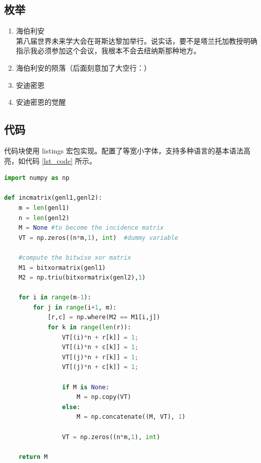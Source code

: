 \documentclass[12]{ctexart}
\begin{document}
\subsection{枚举}

\begin{enumerate}
    \item 海伯利安\\
    第八届世界未来学大会在哥斯达黎加举行。说实话，要不是塔兰托加教授明确指示我必须参加这个会议，我根本不会去纽纳斯那种地方。

    \item 海伯利安的陨落（后面刻意加了大空行：）\\

    \item 安迪密恩

    \item 安迪密恩的觉醒

\end{enumerate}

\subsection{代码}

代码块使用 listings 宏包\cite{listings}实现。配置了等宽小字体，支持多种语言的基本语法高亮，如代码 \ref{lst_code} 所示。

\begin{lstlisting}[language=Python, caption={Python example}, label={lst_code}]
import numpy as np
    
def incmatrix(genl1,genl2):
    m = len(genl1)
    n = len(genl2)
    M = None #to become the incidence matrix
    VT = np.zeros((n*m,1), int)  #dummy variable
    
    #compute the bitwise xor matrix
    M1 = bitxormatrix(genl1)
    M2 = np.triu(bitxormatrix(genl2),1) 

    for i in range(m-1):
        for j in range(i+1, m):
            [r,c] = np.where(M2 == M1[i,j])
            for k in range(len(r)):
                VT[(i)*n + r[k]] = 1;
                VT[(i)*n + c[k]] = 1;
                VT[(j)*n + r[k]] = 1;
                VT[(j)*n + c[k]] = 1;
                
                if M is None:
                    M = np.copy(VT)
                else:
                    M = np.concatenate((M, VT), 1)
                
                VT = np.zeros((n*m,1), int)
    
    return M
\end{lstlisting}
\end{document}
